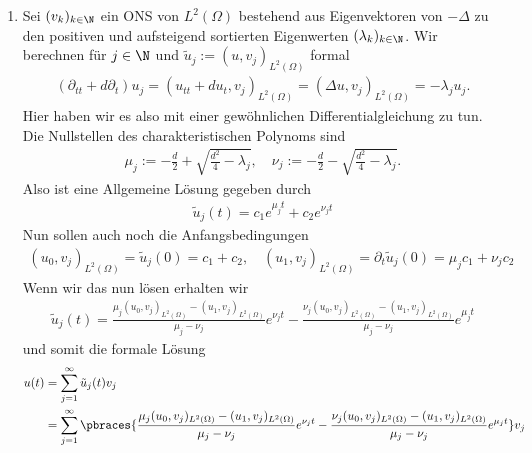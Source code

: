 \begin{solution}
\begin{enumerate}[label = (\roman*)]
    \item Sei $(v_k)_{k \in \N}$ ein ONS von $L^2(\Omega)$ bestehend aus Eigenvektoren von $- \Delta $ zu den positiven und aufsteigend sortierten Eigenwerten $(\lambda_k)_{k \in \N}$. Wir berechnen für $j \in \N$ und $\tilde{u}_j := (u,v_j)_{L^2(\Omega)}$ formal
    \begin{align*}
    	(\partial_{tt} + d \partial_t)u_j = (u_{tt} + du_t, v_j)_{L^2(\Omega)} = (\Delta u, v_j)_{L^2(\Omega)} = -\lambda_j u_j.
    \end{align*}
	Hier haben wir es also mit einer gewöhnlichen Differentialgleichung zu tun. Die Nullstellen des charakteristischen Polynoms sind
	\begin{align*}
		\mu_j := - \frac{d}{2} + \sqrt{\frac{d^2}{4} - \lambda_j}, \quad \nu_j := - \frac{d}{2} - \sqrt{\frac{d^2}{4} - \lambda_j}.
	\end{align*}
	Also ist eine Allgemeine Lösung gegeben durch
	\begin{align*}
		\tilde{u}_j(t) = c_1 e^{\mu_j t} + c_2 e^{\nu_j t}
	\end{align*}
	Nun sollen auch noch die Anfangsbedingungen
	\begin{align*}
		(u_0, v_j)_{L^2(\Omega)} = \tilde{u}_j(0) = c_1 + c_2, \quad (u_1, v_j)_{L^2(\Omega)} = \partial_t \tilde{u}_j(0) = \mu_j c_1 + \nu_j c_2
	\end{align*}
	Wenn wir das nun lösen erhalten wir
	\begin{align*}
		\tilde{u}_j(t) = \frac{\mu_j(u_0, v_j)_{L^2(\Omega)} - (u_1, v_j)_{L^2(\Omega)}}{\mu_j - \nu_j} e^{\nu_j t} - \frac{\nu_j(u_0, v_j)_{L^2(\Omega)} - (u_1, v_j)_{L^2(\Omega)}}{\mu_j - \nu_j} e^{\mu_j t}
	\end{align*}
	und somit die formale Lösung
	\begin{align*}
		u(t) &= \sum_{j=1}^\infty \tilde{u}_j(t) v_j \\
		&= \sum_{j=1}^\infty \pbraces{\frac{\mu_j(u_0, v_j)_{L^2(\Omega)} - (u_1, v_j)_{L^2(\Omega)}}{\mu_j - \nu_j} e^{\nu_j t} - \frac{\nu_j(u_0, v_j)_{L^2(\Omega)} - (u_1, v_j)_{L^2(\Omega)}}{\mu_j - \nu_j} e^{\mu_j t}} v_j
	\end{align*}


\end{enumerate}
\end{solution}
